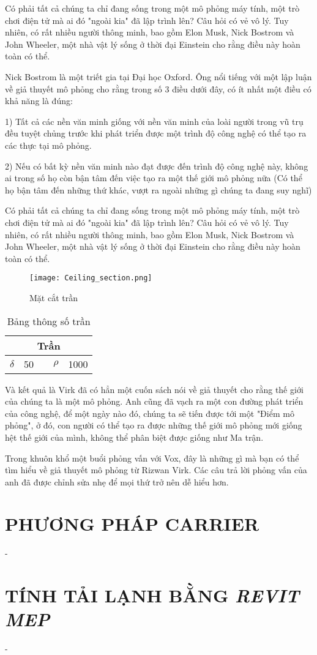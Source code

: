 Có phải tất cả chúng ta chỉ đang sống trong một mô phỏng máy tính, một trò chơi điện tử mà ai đó "ngoài kia" đã lập trình lên? Câu hỏi có vẻ vô lý. Tuy nhiên, có rất nhiều người thông minh, bao gồm Elon Musk, Nick Bostrom và John Wheeler, một nhà vật lý sống ở thời đại Einstein cho rằng điều này hoàn toàn có thể.

Nick Bostrom là một triết gia tại Đại học Oxford. Ông nổi tiếng với một lập luận về giả thuyết mô phỏng cho rằng trong số 3 điều dưới đây, có ít nhất một điều có khả năng là đúng:

1) Tất cả các nền văn minh giống với nền văn minh của loài người trong vũ trụ đều tuyệt chủng trước khi phát triển được một trình độ công nghệ có thể tạo ra các thực tại mô phỏng.

2) Nếu có bất kỳ nền văn minh nào đạt được đến trình độ công nghệ này, không ai trong số họ còn bận tâm đến việc tạo ra một thế giới mô phỏng nữa (Có thể họ bận tâm đến những thứ khác, vượt ra ngoài những gì chúng ta đang suy nghĩ)

Có phải tất cả chúng ta chỉ đang sống trong một mô phỏng máy tính, một trò chơi điện tử mà ai đó "ngoài kia" đã lập trình lên? Câu hỏi có vẻ vô lý. Tuy nhiên, có rất nhiều người thông minh, bao gồm Elon Musk, Nick Bostrom và John Wheeler, một nhà vật lý sống ở thời đại Einstein cho rằng điều này hoàn toàn có thể.


\begin{figure}[H]
	\centering
	\texttt{[image: Ceiling\_section.png]}
	\caption{Mặt cắt trần}
	\label{H:tstran}	
\end{figure}

\begin{wraptable}{l}{0.35\textwidth}
		\centering
		\begin{tabular}{|r|r|r|r|r|}
			\toprule
			\multicolumn{5}{|c|}{\textbf{Trần }} \\
			\midrule
			{\LARGE $\delta$}& 50    &       &{\LARGE $\rho$}& 1000 \\
			\bottomrule
		\end{tabular}%
		\label{B:tstran}%
		\caption{Bảng thông số trần}
\end{wraptable}

Và kết quả là Virk đã có hẳn một cuốn sách nói về giả thuyết cho rằng thế giới của chúng ta là một mô phỏng. Anh cũng đã vạch ra một con đường phát triển của công nghệ, để một ngày nào đó, chúng ta sẽ tiến được tới một "Điểm mô phỏng", ở đó, con người có thể tạo ra được những thế giới mô phỏng mới giống hệt thế giới của mình, không thể phân biệt được giống như Ma trận.

Trong khuôn khổ một buổi phỏng vấn với Vox, đây là những gì mà bạn có thể tìm hiểu về giả thuyết mô phỏng từ Rizwan Virk. Các câu trả lời phỏng vấn của anh đã được chỉnh sửa nhẹ để mọi thứ trở nên dễ hiểu hơn.




\section{PHƯƠNG PHÁP CARRIER}
-

\section{TÍNH TẢI LẠNH BẰNG \emph{REVIT MEP}}
- 
